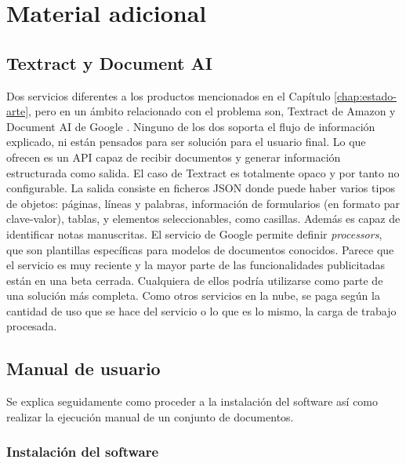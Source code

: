 
\chapter{Material adicional}
\label{chap:material-adicional}

\section{Textract y Document AI}
\label{sec:textract-y-document-ai}

Dos servicios diferentes a los productos mencionados en el Capítulo \ref{chap:estado-arte}, pero en un ámbito relacionado con el problema son, Textract de Amazon \cite{solucionesComerciales_amazon_textract} y Document AI de Google \cite{solucionesComerciales_google_documentAI}. Ninguno de los dos soporta el flujo de información explicado, ni están pensados para ser solución para el usuario final. Lo que ofrecen es un API capaz de recibir documentos y generar información estructurada como salida. El caso de Textract es totalmente opaco y por tanto no configurable. La salida consiste en ficheros JSON donde puede haber varios tipos de objetos: páginas, líneas y palabras, información de formularios (en formato par clave-valor), tablas, y elementos seleccionables, como casillas. Además es capaz de identificar notas manuscritas. El servicio de Google permite definir \emph{processors}, que son plantillas específicas para modelos de documentos conocidos. Parece que el servicio es muy reciente y la mayor parte de las funcionalidades publicitadas están en una beta cerrada. Cualquiera de ellos podría utilizarse como parte de una solución más completa. Como otros servicios en la nube, se paga según la cantidad de uso que se hace del servicio o lo que es lo mismo, la carga de trabajo procesada.

\section{Manual de usuario}
\label{sec:instalacion-software}

Se explica seguidamente como proceder a la instalación del software así como realizar la ejecución manual de un conjunto de documentos.

\subsection{Instalación del software}

